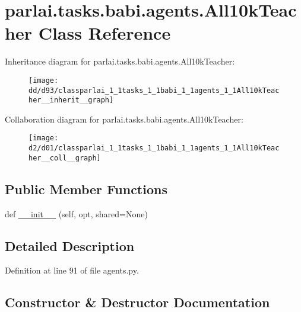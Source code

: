 \hypertarget{classparlai_1_1tasks_1_1babi_1_1agents_1_1All10kTeacher}{}\section{parlai.\+tasks.\+babi.\+agents.\+All10k\+Teacher Class Reference}
\label{classparlai_1_1tasks_1_1babi_1_1agents_1_1All10kTeacher}


Inheritance diagram for parlai.\+tasks.\+babi.\+agents.\+All10k\+Teacher\+:\nopagebreak
\begin{figure}[H]
\begin{center}
\leavevmode
\texttt{[image: dd/d93/classparlai\_1\_1tasks\_1\_1babi\_1\_1agents\_1\_1All10kTeacher\_\_inherit\_\_graph]}
\end{center}
\end{figure}


Collaboration diagram for parlai.\+tasks.\+babi.\+agents.\+All10k\+Teacher\+:\nopagebreak
\begin{figure}[H]
\begin{center}
\leavevmode
\texttt{[image: d2/d01/classparlai\_1\_1tasks\_1\_1babi\_1\_1agents\_1\_1All10kTeacher\_\_coll\_\_graph]}
\end{center}
\end{figure}
\subsection*{Public Member Functions}
\begin{DoxyCompactItemize}
\item 
def \hyperlink{classparlai_1_1tasks_1_1babi_1_1agents_1_1All10kTeacher_a6216cea03cc9b69cea9782819e2ede1d}{\+\_\+\+\_\+init\+\_\+\+\_\+} (self, opt, shared=None)
\end{DoxyCompactItemize}


\subsection{Detailed Description}


Definition at line 91 of file agents.\+py.



\subsection{Constructor \& Destructor Documentation}
\mbox{\label{classparlai_1_1tasks_1_1babi_1_1agents_1_1All10kTeacher_a6216cea03cc9b69cea9782819e2ede1d}} 

